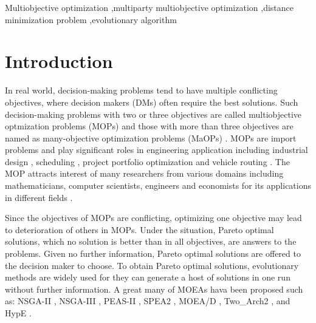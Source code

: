\documentclass[preprint,12pt]{elsarticle}
\begin{document}
\begin{frontmatter}
\begin{keyword}
Multiobjective optimization \sep multiparty multiobjective optimization \sep distance minimization problem \sep evolutionary algorithm


\end{keyword}

\end{frontmatter}


\section{Introduction}\label{sec:introduction}

In real world, decision-making problems tend to have multiple conflicting objectives, where decision makers (DMs) often require the best solutions.
Such decision-making problems with two or three objectives are called multiobjective optmization problems (MOPs) \cite{coello2006evolutionary,fonseca1995overview,tamaki1996multi} and those with more than three objectives are named as many-objective optimization problems (MaOPs) \cite{ishibuchi2008evolutionary,von2014survey,li2015many}.
MOPs are import problems and play significant roles in engineering application including industrial design \cite{rosso2020multi,lin2021multi}, scheduling \cite{ming2017deriving,chiang2019multi}, project portfolio optimization \cite{goli2019hybrid,silva2019multi} and vehicle routing \cite{zhang2019hybrid,braekers2016vehicle}.
The MOP attracts interest of many researchers from various domains including mathematicians, computer scientists, engineers and economists for its applications in different fields \cite{chand2015evolutionary}.

Since the objectives of MOPs are conflicting, optimizing one objective may lead to deterioration of others in MOPs.
Under the situation, Pareto optimal solutions, which no solution is better than in all objectives, are answers to the problems.
Given no further information, Pareto optimal solutions are offered to the decision maker to choose.
To obtain Pareto optimal solutions, evolutionary methods are widely used for they can generate a host of solutions in one run without further information.
A great many of MOEAs hava been proposed such as: NSGA-II \cite{deb2002fast}, NSGA-III \cite{deb2013evolutionary}, PEAS-II \cite{corne2001pesa}, SPEA2 \cite{zitzler2001spea2}, MOEA/D \cite{zhang2007moea}, Two\_Arch2 \cite{wang2014two_arch2}, and HypE \cite{bader2011hype}.
\end{document}
